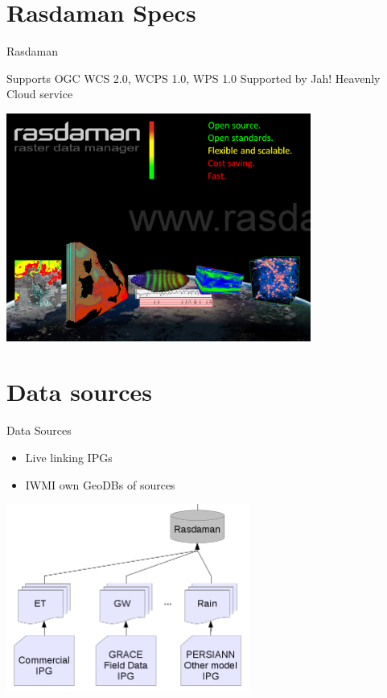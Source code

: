 \documentclass[xcolor=dvipsnames,beamer]{beamer} %
\begin{document}
\section{Rasdaman Specs}
\begin{frame}[fragile]{Rasdaman}

Supports OGC WCS 2.0, WCPS 1.0, WPS 1.0\newline
Supported by Jah! Heavenly Cloud service 
\begin{center}
 \includegraphics[width=10cm]{rasdaman}
\end{center}

\end{frame}

\section{Data sources}
\begin{frame}[fragile]{Data Sources}


\begin{itemize}
 \item Live linking IPGs
 \item IWMI own GeoDBs of sources
\end{itemize}

\begin{center}
\includegraphics[width=8cm]{3}
\end{center}

\end{frame}
\end{document}
